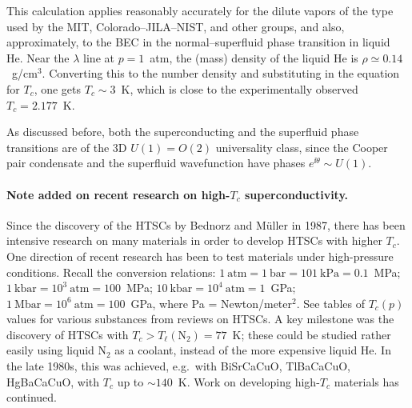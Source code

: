 \begin{diagram}
\end{diagram}

This calculation applies reasonably accurately for the dilute vapors of the type used by the MIT, Colorado--JILA--NIST, and other
groups, and also, approximately, to the BEC in the normal--superfluid phase transition in liquid He. Near the $\lambda$ line at
$p = 1$~atm, the (mass) density of the liquid He is $\rho\simeq 0.14$~g/cm$^3$. Converting this to the number density and
substituting in the equation for $T_c$, one gets $T_c\sim 3$~K, which is close to the experimentally observed $T_c = 2.177$~K.

As discussed before, both the superconducting and the superfluid phase transitions are of the 3D $U(1) = O(2)$ universality class,
since the Cooper pair condensate and the superfluid wavefunction have phases $e^{\ii\theta}\sim U(1)$.

\paragraph{Note added on recent research on high-\texorpdfstring{$T_c$}{Tc} superconductivity.}

Since the discovery of the HTSCs by Bednorz and M\"uller in 1987, there has been intensive research on many materials in order to
develop HTSCs with higher $T_c$. One direction of recent research has been to test materials under high-pressure conditions.
Recall the conversion relations: $1\ \text{atm} = 1\ \text{bar} = 101\ \text{kPa} = 0.1$~MPa;
$1\ \text{kbar} = 10^3\ \text{atm} = 100$~MPa; $10\ \text{kbar} = 10^4\ \text{atm} = 1$~GPa;
$1\ \text{Mbar} = 10^6\ \text{atm} = 100$~GPa, where Pa = Newton/meter$^2$. See tables of $T_c(p)$ values for various substances
from reviews on HTSCs. A key milestone was the discovery of HTSCs with $T_c>T_\ell(\text{N}_2) = 77$~K; these could be studied
rather easily using liquid N$_2$ as a coolant, instead of the more expensive liquid He. In the late 1980s, this was achieved, e.g.\
with BiSrCaCuO, TlBaCaCuO, HgBaCaCuO, with $T_c$ up to $\sim 140$~K. Work on developing high-$T_c$ materials has continued.
